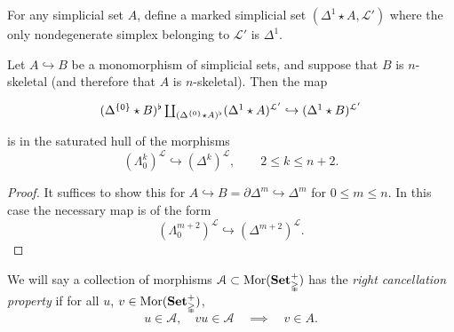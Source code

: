 \documentclass[main.tex]{subfiles}
\begin{document}
 For any simplicial set $A$, define a marked simplicial set $(\Delta^{1} \star A, \mathcal{L'})$ where the only nondegenerate simplex belonging to $\mathcal{L'}$ is $\Delta^{1}$.

\begin{lemma}
  \label{lemma:starred_smash_with_mono}
  Let $A \hookrightarrow B$ be a monomorphism of simplicial sets, and suppose that $B$ is $n$-skeletal (and therefore that $A$ is $n$-skeletal). Then the map
  \begin{equation*}
    \begin{tikzcd}
      (\Delta^{\{0\}} \star B)^{\flat} \coprod_{(\Delta^{\{0\}} \star A)^{\flat}} (\Delta^{1} \star A)^{\mathcal{L}'} \hookrightarrow (\Delta^{1} \star B)^{\mathcal{L}'}
    \end{tikzcd}
  \end{equation*}
  is in the saturated hull of the morphisms
  \begin{equation*}
    (\Lambda^{k}_{0})^{\mathcal{L}} \hookrightarrow (\Delta^{k})^{\mathcal{L}},\qquad 2 \leq k \leq n+2.
  \end{equation*}
\end{lemma}
\begin{proof}
  It suffices to show this for $A \hookrightarrow B = \partial \Delta^{m} \hookrightarrow \Delta^{m}$ for $0 \leq m \leq n$. In this case the necessary map is of the form
  \begin{equation*}
    (\Lambda^{m+2}_{0})^{\mathcal{L}} \hookrightarrow (\Delta^{m+2})^{\mathcal{L}}.
  \end{equation*}
\end{proof}

We will say a collection of morphisms $\mathcal{A} \subset \mathrm{Mor}(\mathbf{Set}_{\mathbb{\Delta}}^{+})$ has the \emph{right cancellation property} if for all $u$, $v \in \mathrm{Mor}(\mathbf{Set}_{\mathbb{\Delta}}^{+})$,
\begin{equation*}
  u \in \mathcal{A},\quad vu \in \mathcal{A} \quad \implies \quad v \in A.
\end{equation*}
\end{document}
